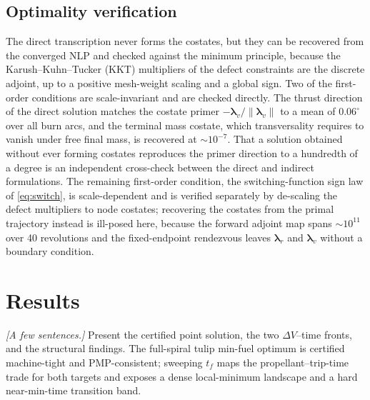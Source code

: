 \documentclass[11pt]{article}
\begin{document}
\subsection{Optimality verification}
The direct transcription never forms the costates, but they can be recovered from
the converged NLP and checked against the minimum principle, because the
Karush--Kuhn--Tucker (KKT) multipliers of the defect constraints are the discrete
adjoint, up to a positive mesh-weight scaling and a global sign. Two of the
first-order conditions are scale-invariant and are checked directly. The thrust
direction of the direct solution matches the costate primer
$-\boldsymbol\lambda_v/\lVert\boldsymbol\lambda_v\rVert$ to a mean of
$0.06^\circ$ over all burn arcs, and the terminal mass costate, which
transversality requires to vanish under free final mass, is recovered at
$\sim\!10^{-7}$. That a solution obtained without ever forming costates
reproduces the primer direction to a hundredth of a degree is an independent
cross-check between the direct and indirect formulations. The remaining
first-order condition, the switching-function sign law of \cref{eq:switch}, is
scale-dependent and is verified separately by de-scaling the defect multipliers
to node costates; recovering the costates from the primal trajectory instead is
ill-posed here, because the forward adjoint map spans $\sim\!10^{11}$ over 40
revolutions and the fixed-endpoint rendezvous leaves $\boldsymbol\lambda_r$ and
$\boldsymbol\lambda_v$ without a boundary condition.

\section{Results}
\label{sec:results}
\emph{[A few sentences.]} Present the certified point solution, the two
$\Delta V$--time fronts, and the structural findings. The full-spiral tulip
min-fuel optimum is certified machine-tight and PMP-consistent; sweeping $t_f$
maps the propellant--trip-time trade for both targets and exposes a dense
local-minimum landscape and a hard near-min-time transition band.
\end{document}
